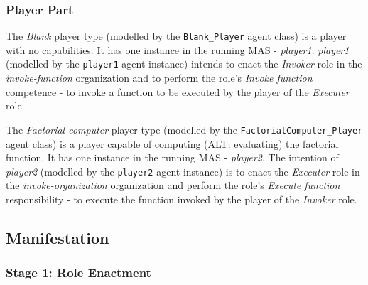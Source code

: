 \subsubsection*{Player Part}

The \textit{Blank} player type (modelled by the \texttt{Blank\_Player} agent class) is a player with no capabilities.
It has one instance in the running MAS - \textit{player1}.
\textit{player1} (modelled by the \texttt{player1} agent instance) intends to enact the \textit{Invoker} role in the \textit{invoke-function} organization and to perform the role's \textit{Invoke function} competence - to invoke a function to be executed by the player of the \textit{Executer} role.

The \textit{Factorial computer} player type (modelled by the \texttt{FactorialComputer\_Player} agent class) is a player capable of computing (ALT: evaluating) the factorial function.
It has one instance in the running MAS - \textit{player2}.
The intention of \textit{player2} (modelled by the \texttt{player2} agent instance) is to enact the \textit{Executer} role in the \textit{invoke-organization} organization and perform the role's \textit{Execute function} responsibility - to execute the function invoked by the player of the \textit{Invoker} role.

\subsection*{Manifestation}

\subsubsection*{Stage 1: Role Enactment}

